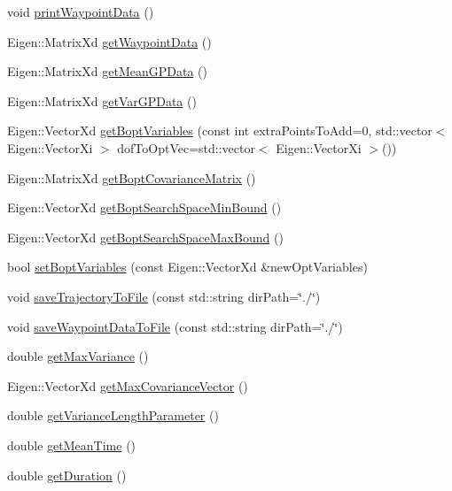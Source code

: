 \begin{DoxyCompactItemize}
\item 
void \hyperlink{classocra_1_1GaussianProcessTrajectory_a9bc3e80de07b90f2fc13bd8442fb7d02}{print\+Waypoint\+Data} ()
\item 
Eigen\+::\+Matrix\+Xd \hyperlink{classocra_1_1GaussianProcessTrajectory_af345fbbe285d7758c7a4bab7d83b0f02}{get\+Waypoint\+Data} ()
\item 
Eigen\+::\+Matrix\+Xd \hyperlink{classocra_1_1GaussianProcessTrajectory_a3fcbdcde2ce99b1bbf1835b2d90e7627}{get\+Mean\+G\+P\+Data} ()
\item 
Eigen\+::\+Matrix\+Xd \hyperlink{classocra_1_1GaussianProcessTrajectory_ae48f9f25299cf749a973e4b4341ec909}{get\+Var\+G\+P\+Data} ()
\item 
Eigen\+::\+Vector\+Xd \hyperlink{classocra_1_1GaussianProcessTrajectory_af2815cd9e07b8470a5850474dd19e708}{get\+Bopt\+Variables} (const int extra\+Points\+To\+Add=0, std\+::vector$<$ Eigen\+::\+Vector\+Xi $>$ dof\+To\+Opt\+Vec=std\+::vector$<$ Eigen\+::\+Vector\+Xi $>$())
\item 
Eigen\+::\+Matrix\+Xd \hyperlink{classocra_1_1GaussianProcessTrajectory_ae5e2bdca5a250cbce6af8e38898a61c8}{get\+Bopt\+Covariance\+Matrix} ()
\item 
Eigen\+::\+Vector\+Xd \hyperlink{classocra_1_1GaussianProcessTrajectory_a4678cb03e8523c8c5d489c91623a6ce4}{get\+Bopt\+Search\+Space\+Min\+Bound} ()
\item 
Eigen\+::\+Vector\+Xd \hyperlink{classocra_1_1GaussianProcessTrajectory_a82a83fb9fd6351253f5d317747edf12c}{get\+Bopt\+Search\+Space\+Max\+Bound} ()
\item 
bool \hyperlink{classocra_1_1GaussianProcessTrajectory_a96001abecd8f8bb1303acc1a327a485e}{set\+Bopt\+Variables} (const Eigen\+::\+Vector\+Xd \&new\+Opt\+Variables)
\item 
void \hyperlink{classocra_1_1GaussianProcessTrajectory_ad7fc4b5e2163353090d6d34bd5040961}{save\+Trajectory\+To\+File} (const std\+::string dir\+Path=\char`\"{}./\char`\"{})
\item 
void \hyperlink{classocra_1_1GaussianProcessTrajectory_a386f928a68ec125b184d6a4f9801ab1e}{save\+Waypoint\+Data\+To\+File} (const std\+::string dir\+Path=\char`\"{}./\char`\"{})
\item 
double \hyperlink{classocra_1_1GaussianProcessTrajectory_af5d0a9c6d68d74e60ffa0a6290f4cd6a}{get\+Max\+Variance} ()
\item 
Eigen\+::\+Vector\+Xd \hyperlink{classocra_1_1GaussianProcessTrajectory_a87864b7a3a7fd6b0384b28ad7d58a3c2}{get\+Max\+Covariance\+Vector} ()
\item 
double \hyperlink{classocra_1_1GaussianProcessTrajectory_a7292af0c33589a01c7152f2316362c15}{get\+Variance\+Length\+Parameter} ()
\item 
double \hyperlink{classocra_1_1GaussianProcessTrajectory_af8cc8748b3d59d41a9af05549cb02228}{get\+Mean\+Time} ()
\item 
double \hyperlink{classocra_1_1GaussianProcessTrajectory_a03444da89e14a8b77f76800c96d3bab2}{get\+Duration} ()
\end{DoxyCompactItemize}
